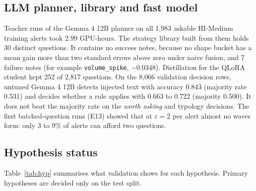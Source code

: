 \documentclass[11pt,a4paper]{article}
\newcommand{\eps}{\varepsilon}
\begin{document}
\subsection{LLM planner, library and fast model}

Teacher runs of the Gemma 4 12B planner on all 1,983 askable HI-Medium training alerts took 2.99 GPU-hours. The strategy library built from them holds 30 distinct questions. It contains no success notes, because no shape bucket has a mean gain more than two standard errors above zero under naive fusion, and 7 failure notes (for example \texttt{volume\_spike}, $-0.0348$). Distillation for the QLoRA student kept 252 of 2,817 questions. On the 8,066 validation decision rows, untuned Gemma 4 12B detects injected text with accuracy 0.843 (majority rate 0.531) and decides whether a rule applies with 0.663 to 0.722 (majority 0.500). It does not beat the majority rate on the \emph{worth asking} and typology decisions. The first batched-question runs (E13) showed that at $\eps=2$ per alert almost no waves form: only 3 to 9\% of alerts can afford two questions.

\subsection{Hypothesis status}

Table~\ref{tab:hyp} summarises what validation shows for each hypothesis. Primary hypotheses are decided only on the test split.
\end{document}
